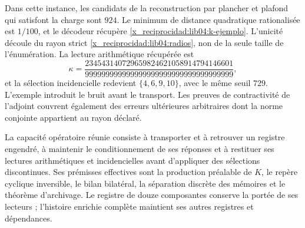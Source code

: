 Dans cette instance, les candidats de la reconstruction par plancher et
plafond qui satisfont la charge sont \(924\). Le minimum de distance
quadratique rationalisée est \(1/100\), et le décodeur récupère
\eqref{x_reciprocidad:lib04:k-ejemplo}. L’unicité découle du rayon strict
\eqref{x_reciprocidad:lib04:radios}, non de la seule taille de l’énumération.
La lecture arithmétique récupérée est
\begin{equation}
 \kappa=
 \frac{234543140729659824621058914794146601}
      {999999999999999999999999999999999999},
 \label{x_reciprocidad:lib04:kappa-ejemplo}
\end{equation}
et la sélection incidencielle redevient \(\{4,6,9,10\}\), avec
le même seuil \(729\). L’exemple introduit le bruit avant le
transport. Les preuves de contractivité de l’adjoint couvrent également
des erreurs ultérieures arbitraires dont la norme conjointe appartient au
rayon déclaré.

La capacité opératoire réunie consiste à transporter et à retrouver un registre
engendré, à maintenir le conditionnement de ses réponses et à restituer
ses lectures arithmétiques et incidencielles avant d’appliquer des sélections
discontinues. Ses prémisses effectives sont la production préalable de
\(K\), le repère cyclique inversible, le bilan bilatéral, la
séparation discrète des mémoires et le théorème d’archivage. Le
registre de douze composantes conserve la portée de ses lecteurs ;
l’histoire enrichie complète maintient ses autres registres et
dépendances.
